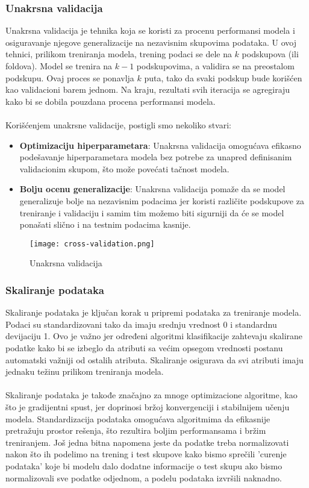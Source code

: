 \documentclass[a4paper,12pt]{article}
\begin{document}
\subsubsection{Unakrsna validacija}
Unakrsna validacija je tehnika koja se koristi za procenu performansi modela i osiguravanje njegove generalizacije na nezavisnim skupovima podataka. U ovoj tehnici, prilikom treniranja modela, trening podaci se dele na $k$ podskupova (ili foldova). Model se trenira na $k-1$ podskupovima, a validira se na preostalom podskupu. Ovaj proces se ponavlja $k$ puta, tako da svaki podskup bude korišćen kao validacioni barem jednom. Na kraju, rezultati svih iteracija se agregiraju kako bi se dobila pouzdana procena performansi modela.\\\\
Korišćenjem unakrsne validacije, postigli smo nekoliko stvari:
\begin{itemize}
    \item \textbf{Optimizaciju hiperparametara}: Unakrsna validacija omogućava efikasno podešavanje hiperparametara modela bez potrebe za unapred definisanim validacionim skupom, što može povećati tačnost modela.
    \item \textbf{Bolju ocenu generalizacije}: Unakrsna validacija pomaže da se model generalizuje bolje na nezavisnim podacima jer koristi različite podskupove za treniranje i validaciju i samim tim možemo biti sigurniji da će se model ponašati slično i na testnim podacima kasnije.
\end{itemize}

\begin{figure}[H]
\centering
\texttt{[image: cross-validation.png]}
\caption{Unakrsna validacija}
\label{fig:cross_validation}
\end{figure}

\subsubsection{Skaliranje podataka}
Skaliranje podataka je ključan korak u pripremi podataka za treniranje modela. Podaci su standardizovani tako da imaju srednju vrednost 0 i standardnu devijaciju 1. Ovo je važno jer određeni algoritmi klasifikacije zahtevaju skalirane podatke kako bi se izbeglo da atributi sa većim opsegom vrednosti postanu automatski važniji od ostalih atributa. Skaliranje osigurava da svi atributi imaju jednaku težinu prilikom treniranja modela.\\\\
Skaliranje podataka je takođe značajno za mnoge optimizacione algoritme, kao što je gradijentni spust, jer doprinosi bržoj konvergenciji i stabilnijem učenju modela. Standardizacija podataka omogućava algoritmima da efikasnije pretražuju prostor rešenja, što rezultira boljim performansama i bržim treniranjem.
Još jedna bitna napomena jeste da podatke treba normalizovati nakon što ih podelimo na trening i test skupove kako bismo sprečili 'curenje podataka' koje bi modelu dalo dodatne informacije o test skupu ako bismo normalizovali sve podatke odjednom, a podelu podataka izvršili naknadno.
\end{document}
